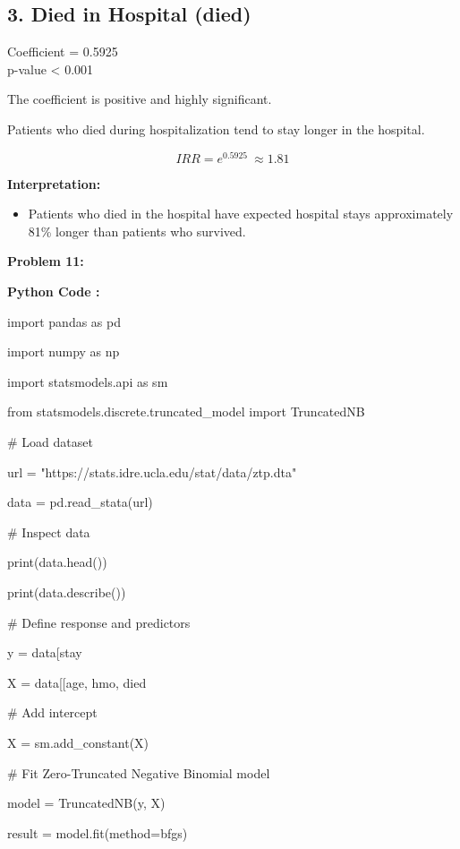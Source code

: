 \documentclass[
]{article}
\begin{document}
\subsection{\texorpdfstring{\textbf{3. Died in Hospital
(died)}}{3. Died in Hospital (died)}}\label{died-in-hospital-died}

Coefficient = 0.5925\\
p-value \textless{} 0.001

The coefficient is positive and highly significant.

Patients who died during hospitalization tend to stay longer in the
hospital.

\[IRR = e^{0.5925}\  \approx 1.81\]

\textbf{Interpretation:}

\begin{itemize}
\item
  Patients who died in the hospital have expected hospital stays
  approximately 81\% longer than patients who survived.
\end{itemize}

\textbf{Problem 11:}

\textbf{Python Code :}

import pandas as pd

import numpy as np

import statsmodels.api as sm

from statsmodels.discrete.truncated\_model import TruncatedNB

\# Load dataset

url = "https://stats.idre.ucla.edu/stat/data/ztp.dta"

data = pd.read\_stata(url)

\# Inspect data

print(data.head())

print(data.describe())

\# Define response and predictors

y = data{[}\textquotesingle stay\textquotesingle{]}

X = data{[}{[}\textquotesingle age\textquotesingle,
\textquotesingle hmo\textquotesingle,
\textquotesingle died\textquotesingle{]}{]}

\# Add intercept

X = sm.add\_constant(X)

\# Fit Zero-Truncated Negative Binomial model

model = TruncatedNB(y, X)

result = model.fit(method=\textquotesingle bfgs\textquotesingle)
\end{document}

